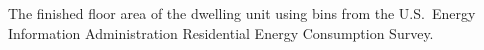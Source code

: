 The finished floor area of the dwelling unit using bins from the U.S.~Energy Information Administration Residential Energy Consumption Survey.

